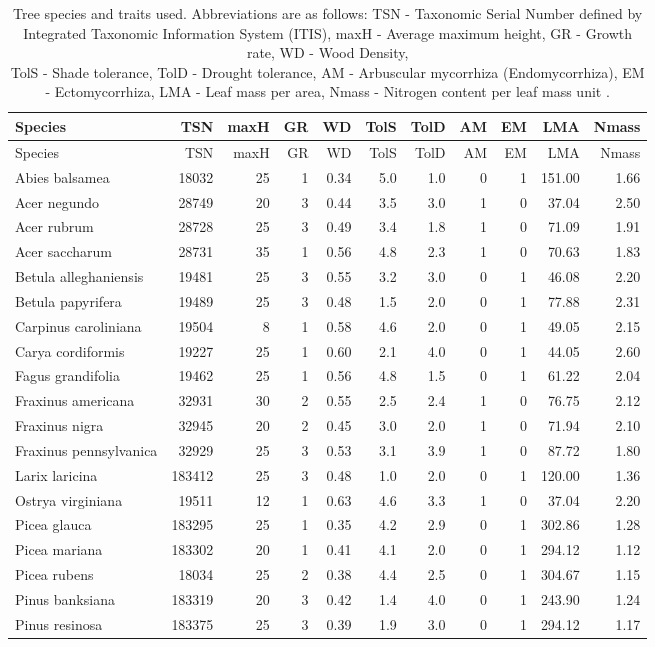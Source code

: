 \begin{landscape}
\begin{longtable}[]{@{}lrrrrrrrrrr@{}}
\caption{Tree species and traits used. Abbreviations are as follows: TSN
- Taxonomic Serial Number defined by Integrated Taxonomic Information
System (ITIS), maxH - Average maximum height, GR - Growth rate, WD -
Wood Density,\\
TolS - Shade tolerance, TolD - Drought tolerance, AM - Arbuscular
mycorrhiza (Endomycorrhiza), EM - Ectomycorrhiza, LMA - Leaf mass per
area, Nmass - Nitrogen content per leaf mass unit \citep{Paquette2011}.
\label{tbl:trees}}\tabularnewline
\toprule
Species & TSN & maxH & GR & WD & TolS & TolD & AM & EM & LMA &
Nmass\tabularnewline
\midrule
\endfirsthead
\toprule
Species & TSN & maxH & GR & WD & TolS & TolD & AM & EM & LMA &
Nmass\tabularnewline
\midrule
\endhead
Abies balsamea & 18032 & 25 & 1 & 0.34 & 5.0 & 1.0 & 0 & 1 & 151.00 &
1.66\tabularnewline
Acer negundo & 28749 & 20 & 3 & 0.44 & 3.5 & 3.0 & 1 & 0 & 37.04 &
2.50\tabularnewline
Acer rubrum & 28728 & 25 & 3 & 0.49 & 3.4 & 1.8 & 1 & 0 & 71.09 &
1.91\tabularnewline
Acer saccharum & 28731 & 35 & 1 & 0.56 & 4.8 & 2.3 & 1 & 0 & 70.63 &
1.83\tabularnewline
Betula alleghaniensis & 19481 & 25 & 3 & 0.55 & 3.2 & 3.0 & 0 & 1 &
46.08 & 2.20\tabularnewline
Betula papyrifera & 19489 & 25 & 3 & 0.48 & 1.5 & 2.0 & 0 & 1 & 77.88 &
2.31\tabularnewline
Carpinus caroliniana & 19504 & 8 & 1 & 0.58 & 4.6 & 2.0 & 0 & 1 & 49.05
& 2.15\tabularnewline
Carya cordiformis & 19227 & 25 & 1 & 0.60 & 2.1 & 4.0 & 0 & 1 & 44.05 &
2.60\tabularnewline
Fagus grandifolia & 19462 & 25 & 1 & 0.56 & 4.8 & 1.5 & 0 & 1 & 61.22 &
2.04\tabularnewline
Fraxinus americana & 32931 & 30 & 2 & 0.55 & 2.5 & 2.4 & 1 & 0 & 76.75 &
2.12\tabularnewline
Fraxinus nigra & 32945 & 20 & 2 & 0.45 & 3.0 & 2.0 & 1 & 0 & 71.94 &
2.10\tabularnewline
Fraxinus pennsylvanica & 32929 & 25 & 3 & 0.53 & 3.1 & 3.9 & 1 & 0 &
87.72 & 1.80\tabularnewline
Larix laricina & 183412 & 25 & 3 & 0.48 & 1.0 & 2.0 & 0 & 1 & 120.00 &
1.36\tabularnewline
Ostrya virginiana & 19511 & 12 & 1 & 0.63 & 4.6 & 3.3 & 1 & 0 & 37.04 &
2.20\tabularnewline
Picea glauca & 183295 & 25 & 1 & 0.35 & 4.2 & 2.9 & 0 & 1 & 302.86 &
1.28\tabularnewline
Picea mariana & 183302 & 20 & 1 & 0.41 & 4.1 & 2.0 & 0 & 1 & 294.12 &
1.12\tabularnewline
Picea rubens & 18034 & 25 & 2 & 0.38 & 4.4 & 2.5 & 0 & 1 & 304.67 &
1.15\tabularnewline
Pinus banksiana & 183319 & 20 & 3 & 0.42 & 1.4 & 4.0 & 0 & 1 & 243.90 &
1.24\tabularnewline
Pinus resinosa & 183375 & 25 & 3 & 0.39 & 1.9 & 3.0 & 0 & 1 & 294.12 &
1.17\tabularnewline

\end{longtable}
\end{landscape}
